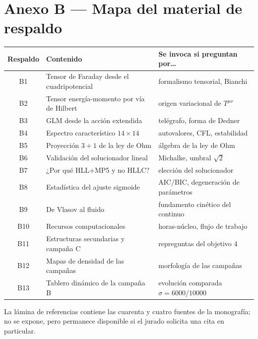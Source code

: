 \documentclass[11pt,letterpaper]{article}
\begin{document}
\section{Anexo B --- Mapa del material de respaldo}

\begin{center}
\begin{tabular}{@{}cll@{}}
\toprule
Respaldo & Contenido & Se invoca si preguntan por\ldots\\
\midrule
B1  & Tensor de Faraday desde el cuadripotencial & formalismo tensorial, Bianchi\\
B2  & Tensor energía-momento por vía de Hilbert  & origen variacional de $T^{\mu\nu}$\\
B3  & GLM desde la acción extendida              & telégrafo, forma de Dedner\\
B4  & Espectro característico $14\times14$       & autovalores, CFL, estabilidad\\
B5  & Proyección $3+1$ de la ley de Ohm          & álgebra de la ley de Ohm\\
B6  & Validación del solucionador lineal          & Michalke, umbral $\sqrt2$\\
B7  & ¿Por qué HLL$+$MP5 y no HLLC?              & elección del solucionador\\
B8  & Estadística del ajuste sigmoide             & AIC/BIC, degeneración de parámetros\\
B9  & De Vlasov al fluido                         & fundamento cinético del continuo\\
B10 & Recursos computacionales                    & horas-núcleo, flujo de trabajo\\
B11 & Estructuras secundarias y campaña C         & repreguntas del objetivo 4\\
B12 & Mapas de densidad de las campañas           & morfología de las campañas\\
B13 & Tablero dinámico de la campaña B            & evolución comparada $\sigma=6000$/$10000$\\
\bottomrule
\end{tabular}
\end{center}

\vspace{6pt}
La lámina de referencias contiene las cuarenta y cuatro fuentes de la
monografía; no se expone, pero permanece disponible si el jurado solicita
una cita en particular.
\end{document}
